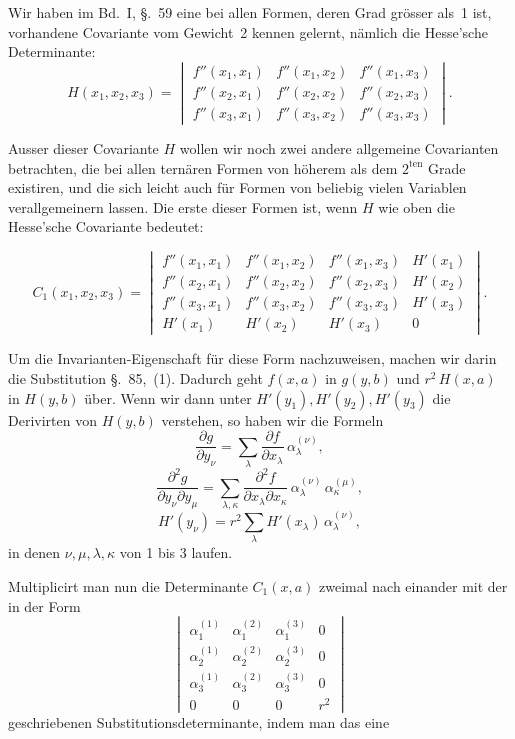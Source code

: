 \documentclass[12pt,a4paper]{article}
\begin{document}
Wir haben im Bd.~I, \S.~59 eine bei allen Formen, deren Grad gr\"osser als~1 ist, vorhandene Covariante vom Gewicht~2 kennen gelernt, n\"amlich die Hesse'sche Determinante:
\begin{equation}
\tag{2}
H(x_1,x_2,x_3) =
\begin{vmatrix}
f''(x_1,x_1) & f''(x_1,x_2) & f''(x_1,x_3)\\
f''(x_2,x_1) & f''(x_2,x_2) & f''(x_2,x_3)\\
f''(x_3,x_1) & f''(x_3,x_2) & f''(x_3,x_3)
\end{vmatrix}.
\end{equation}

Ausser dieser Covariante $H$ wollen wir noch zwei andere allgemeine Covarianten betrachten, die bei allen tern\"aren Formen von h\"oherem als dem $2^{\text{ten}}$ Grade existiren, und die sich leicht auch f\"ur Formen von beliebig vielen Variablen verallgemeinern lassen. Die erste dieser Formen ist, wenn $H$ wie oben die Hesse'sche Covariante bedeutet:

\[
C_1(x_1,x_2,x_3) =
\begin{vmatrix}
f''(x_1,x_1) & f''(x_1,x_2) & f''(x_1,x_3) & H'(x_1)\\
f''(x_2,x_1) & f''(x_2,x_2) & f''(x_2,x_3) & H'(x_2)\\
f''(x_3,x_1) & f''(x_3,x_2) & f''(x_3,x_3) & H'(x_3)\\
H'(x_1) & H'(x_2) & H'(x_3) & 0
\end{vmatrix}.
\]

Um die Invarianten-Eigenschaft f\"ur diese Form nachzuweisen, machen wir darin die Substitution \S.~85,~(1). Dadurch geht $f(x,a)$ in $g(y,b)$ und $r^2\,H(x,a)$ in $H(y,b)$ \"uber. Wenn wir dann unter $H'(y_1),H'(y_2),H'(y_3)$ die Derivirten von $H(y,b)$ verstehen, so haben wir die Formeln
\[
\frac{\partial g}{\partial y_{\nu}} = \sum_{\lambda} \frac{\partial f}{\partial x_{\lambda}}\,\alpha_{\lambda}^{(\nu)},
\]
\[
\frac{\partial^2 g}{\partial y_{\nu}\partial y_{\mu}} = \sum_{\lambda,\kappa} \frac{\partial^2 f}{\partial x_{\lambda}\partial x_{\kappa}}\,\alpha_{\lambda}^{(\nu)}\,\alpha_{\kappa}^{(\mu)},
\]
\[
H'(y_{\nu}) = r^2 \sum_{\lambda} H'(x_{\lambda})\,\alpha_{\lambda}^{(\nu)},
\]
in denen $\nu,\mu,\lambda,\kappa$ von 1 bis 3 laufen.

Multiplicirt man nun die Determinante $C_1(x,a)$ zweimal nach einander mit der in der Form
\[
\begin{vmatrix}
\alpha_1^{(1)} & \alpha_1^{(2)} & \alpha_1^{(3)} & 0\\
\alpha_2^{(1)} & \alpha_2^{(2)} & \alpha_2^{(3)} & 0\\
\alpha_3^{(1)} & \alpha_3^{(2)} & \alpha_3^{(3)} & 0\\
0 & 0 & 0 & r^2
\end{vmatrix}
\]
geschriebenen Substitutionsdeterminante, indem man das eine
\end{document}
